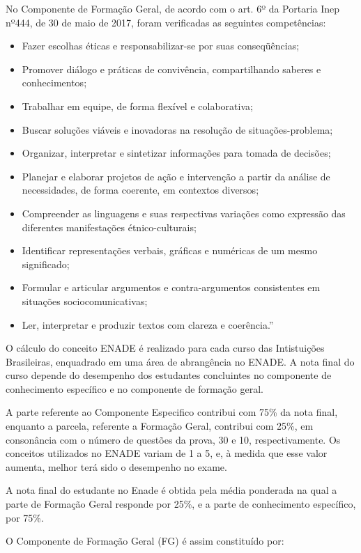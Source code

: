 \documentclass[12pt]{article}
\begin{document}
	  

No Componente de Formação Geral, de acordo com o art. 6º da Portaria Inep nº444, de 30 de maio de 2017, foram verificadas as seguintes competências:

\begin{itemize}
\item Fazer escolhas éticas e responsabilizar-se por suas conseqüências; 
\item Promover diálogo e práticas de convivência, compartilhando saberes e conhecimentos; 
\item Trabalhar em equipe, de forma flexível e colaborativa; 
\item Buscar soluções viáveis e inovadoras na resolução de situações-problema;
\item Organizar, interpretar e sintetizar informações para tomada de decisões; 
\item Planejar e elaborar projetos de ação e intervenção a partir da análise de necessidades, de forma coerente, em contextos diversos; 
\item Compreender as linguagens e suas respectivas variações como expressão das diferentes manifestações étnico-culturais;
\item Identificar representações verbais, gráficas e numéricas de um mesmo significado; 
\item Formular e articular argumentos e contra-argumentos consistentes em situações sociocomunicativas;
\item Ler, interpretar e produzir textos com clareza e coerência.”
\end{itemize}

O cálculo do conceito ENADE é realizado para cada curso das Intistuições Brasileiras, enquadrado em uma área de abrangência no ENADE. A nota final do curso depende do desempenho dos estudantes concluintes no componente de conhecimento específico e no componente de formação geral.

A parte referente ao Componente Especifico contribui com 75\% da nota final, enquanto a parcela, referente a Formação Geral, contribui com 25\%, em consonância com o número de questões da prova, 30 e 10, respectivamente. Os conceitos utilizados no ENADE variam de 1 a 5, e, à medida que esse valor aumenta, melhor terá sido o desempenho no exame.

A nota final do estudante no Enade é obtida pela média ponderada na qual a parte de Formação Geral responde por 25\%, e a parte de conhecimento específico, por 75\%.


O Componente de Formação Geral (FG) é assim constituído por: 
\end{document}
